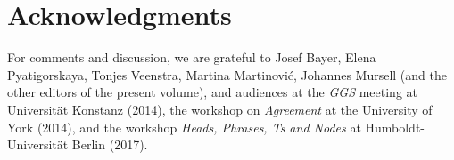 \documentclass[output=paper
,modfonts
,nonflat]{langsci/langscibook}
\begin{document}
	\section*{Acknowledgments}
	For comments and discussion, we are grateful to Josef Bayer, Elena
	Pyatigorskaya, Tonjes Veenstra, Martina Martinovi\'c, Johannes Mursell
	(and the other editors of the present volume), and audiences at the
	{\itshape GGS} meeting at Universit{\"a}t Konstanz (2014), the workshop on
	{\itshape Agreement} at the University of York (2014), and the workshop
	{\itshape Heads, Phrases, Ts and Nodes} at Humboldt-Universit{\"a}t Berlin (2017).
	
	{\sloppy
		\printbibliography[heading=subbibliography,notkeyword=this]}
\end{document}
